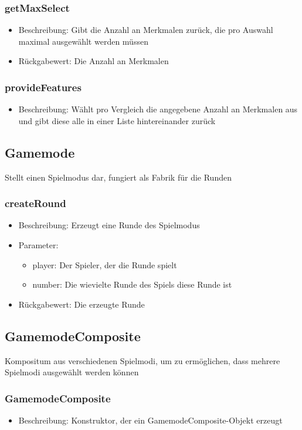 \documentclass[a4paper]{scrreprt}
\begin{document}
	\subsubsection{getMaxSelect}
	\begin{itemize}
		\item Beschreibung: Gibt die Anzahl an Merkmalen zurück, die pro Auswahl maximal ausgewählt werden müssen
		\item Rückgabewert: Die Anzahl an Merkmalen
	\end{itemize}
	\subsubsection{provideFeatures}
	\begin{itemize}
		\item Beschreibung: Wählt pro Vergleich die angegebene Anzahl an Merkmalen aus und gibt diese alle in einer Liste hintereinander zurück
	\end{itemize}

	\subsection{Gamemode}
	Stellt einen Spielmodus dar, fungiert als Fabrik für die Runden
	\subsubsection{createRound}
	\begin{itemize}
		\item Beschreibung: Erzeugt eine Runde des Spielmodus
		\item Parameter:
		\begin{itemize}
			\item player: Der Spieler, der die Runde spielt
			\item number: Die wievielte Runde des Spiels diese Runde ist
		\end{itemize}
		\item Rückgabewert: Die erzeugte Runde
	\end{itemize}

	\subsection{GamemodeComposite}
	Kompositum aus verschiedenen Spielmodi, um zu ermöglichen, dass mehrere Spielmodi ausgewählt werden können
	\subsubsection{GamemodeComposite}
	\begin{itemize}
		\item Beschreibung: Konstruktor, der ein GamemodeComposite-Objekt erzeugt
	\end{itemize}
\end{document}
